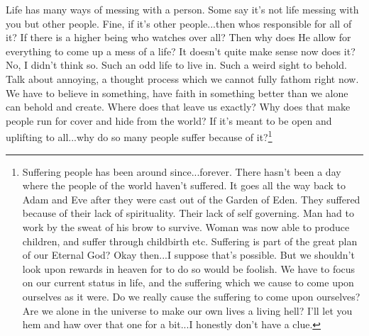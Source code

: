 Life has many ways of messing with a person. Some say it's not life messing with
you but other people. Fine, if it's other people...then whos responsible for all
of it? If there is a higher being who watches over all? Then why does He allow
for everything to come up a mess of a life? It doesn't quite make sense now does
it? No, I didn't think so. Such an odd life to live in. Such a weird sight to
behold. Talk about annoying, a thought process which we cannot fully fathom
right now. We have to believe in something, have faith in something better than
we alone can behold and create. Where does that leave us exactly? Why does that
make people run for cover and hide from the world? If it's meant to be open and
uplifting to all...why do so many people suffer because of it?\footnote{
Suffering people has been around since...forever. There hasn't been a day where
the people of the world haven't suffered. It goes all the way back to Adam and
Eve after they were cast out of the Garden of Eden. They suffered because of
their lack of spirituality. Their lack of self governing. Man had to work by the
sweat of his brow to survive. Woman was now able to produce children, and suffer
through childbirth etc. Suffering is part of the great plan of our Eternal God?
Okay then...I suppose that's possible. But we shouldn't look upon rewards in
heaven for to do so would be foolish. We have to focus on our current status in
life, and the suffering which we cause to come upon ourselves as it were. Do we
really cause the suffering to come upon ourselves? Are we alone in the universe
to make our own lives a living hell? I'll let you hem and haw over that one for
a bit...I honestly don't have a clue.
}
